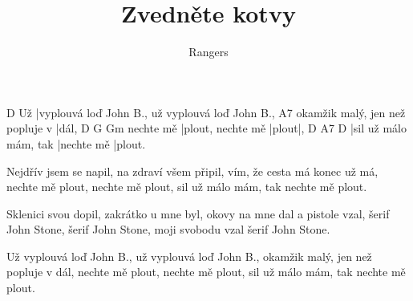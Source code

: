 \documentclass{song}
\title{Zvedněte kotvy}
\author{Rangers}
\begin{document}
\strophe
   D
Už |vyplouvá loď John B., už vyplouvá loď John B.,
                                A7
okamžik malý, jen než popluje v |dál,
          D                 G     Gm
nechte mě |plout, nechte mě |plout|,
D                     A7         D
|sil už málo mám, tak |nechte mě |plout.
\endstrophe

\strophe*
Nejdřív jsem se napil, na zdraví všem připil,
vím, že cesta má konec už má,
nechte mě plout, nechte mě plout,
sil už málo mám, tak nechte mě plout.
\endstrophe

\strophe*
Sklenici svou dopil, zakrátko u mne byl,
okovy na mne dal a pistole vzal,
šerif John Stone, šerif John Stone,
moji svobodu vzal šerif John Stone.
\endstrophe

\strophe*
Už vyplouvá loď John B., už vyplouvá loď John B.,
okamžik malý, jen než popluje v dál,
nechte mě plout, nechte mě plout,
sil už málo mám, tak nechte mě plout.
\endstrophe
\end{document}
